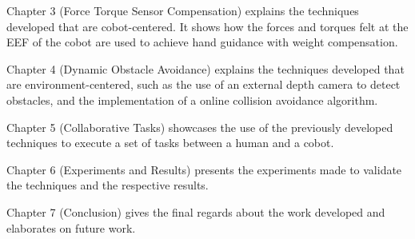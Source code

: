 \par Chapter 3 (Force Torque Sensor Compensation) explains the techniques developed that are cobot-centered. It shows how the forces and torques felt at the EEF of the cobot are used to achieve hand guidance with weight compensation.
\par Chapter 4 (Dynamic Obstacle Avoidance) explains the techniques developed that are environment-centered, such as the use of an external depth camera to detect obstacles, and the implementation of a online collision avoidance algorithm.

\par Chapter 5 (Collaborative Tasks) showcases the use of the previously developed techniques to execute a set of tasks between a human and a cobot.
\par Chapter 6 (Experiments and Results) presents the experiments made to validate the techniques and the respective results.
\par Chapter 7 (Conclusion) gives the final regards about the work developed and elaborates on future work.
